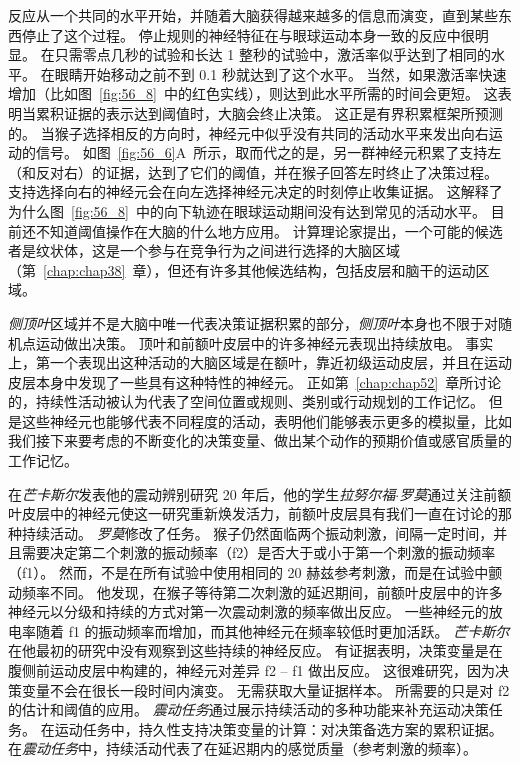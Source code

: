 反应从一个共同的水平开始，并随着大脑获得越来越多的信息而演变，直到某些东西停止了这个过程。
停止规则的神经特征在与眼球运动本身一致的反应中很明显。
在只需零点几秒的试验和长达 1 整秒的试验中，激活率似乎达到了相同的水平。
在眼睛开始移动之前不到 0.1 秒就达到了这个水平。
当然，如果激活率快速增加（比如图~\ref{fig:56_8}~中的红色实线），则达到此水平所需的时间会更短。
这表明当累积证据的表示达到阈值时，大脑会终止决策。
这正是有界积累框架所预测的。
当猴子选择相反的方向时，神经元中似乎没有共同的活动水平来发出向右运动的信号。
如图~\ref{fig:56_6}A~所示，取而代之的是，另一群神经元积累了支持左（和反对右）的证据，达到了它们的阈值，并在猴子回答左时终止了决策过程。
支持选择向右的神经元会在向左选择神经元决定的时刻停止收集证据。
这解释了为什么图~\ref{fig:56_8}~中的向下轨迹在眼球运动期间没有达到常见的活动水平。
目前还不知道阈值操作在大脑的什么地方应用。
计算理论家提出，一个可能的候选者是纹状体，这是一个参与在竞争行为之间进行选择的大脑区域（第~\ref{chap:chap38}~章），但还有许多其他候选结构，包括皮层和脑干的运动区域。


\textit{侧顶叶}区域并不是大脑中唯一代表决策证据积累的部分，\textit{侧顶叶}本身也不限于对随机点运动做出决策。
顶叶和前额叶皮层中的许多神经元表现出持续放电。
事实上，第一个表现出这种活动的大脑区域是在额叶，靠近初级运动皮层，并且在运动皮层本身中发现了一些具有这种特性的神经元。
正如第~\ref{chap:chap52}~章所讨论的，持续性活动被认为代表了空间位置或规则、类别或行动规划的工作记忆。
但是这些神经元也能够代表不同程度的活动，表明他们能够表示更多的模拟量，比如我们接下来要考虑的不断变化的决策变量、做出某个动作的预期价值或感官质量的工作记忆。


在\textit{芒卡斯尔}发表他的震动辨别研究 20 年后，他的学生\textit{拉努尔福$\cdot$罗莫}通过关注前额叶皮层中的神经元使这一研究重新焕发活力，前额叶皮层具有我们一直在讨论的那种持续活动。
\textit{罗莫}修改了任务。
猴子仍然面临两个振动刺激，间隔一定时间，并且需要决定第二个刺激的振动频率（f2）是否大于或小于第一个刺激的振动频率（f1）。
然而，不是在所有试验中使用相同的 20 赫兹参考刺激，而是在试验中颤动频率不同。
他发现，在猴子等待第二次刺激的延迟期间，前额叶皮层中的许多神经元以分级和持续的方式对第一次震动刺激的频率做出反应。
一些神经元的放电率随着 f1 的振动频率而增加，而其他神经元在频率较低时更加活跃。
\textit{芒卡斯尔}在他最初的研究中没有观察到这些持续的神经反应。
有证据表明，决策变量是在腹侧前运动皮层中构建的，神经元对差异 f2 – f1 做出反应。
这很难研究，因为决策变量不会在很长一段时间内演变。
无需获取大量证据样本。
所需要的只是对 f2 的估计和阈值的应用。
\textit{震动任务}通过展示持续活动的多种功能来补充运动决策任务。
在运动任务中，持久性支持决策变量的计算：对决策备选方案的累积证据。
在\textit{震动任务}中，持续活动代表了在延迟期内的感觉质量（参考刺激的频率）。



